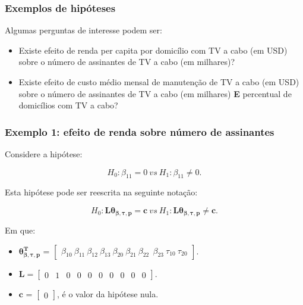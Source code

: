\documentclass[10pt,
  aspectratio=169,
  serif,
  mathserif,
  professionalfont,
  compress,
  handout,
  ]{beamer}\usepackage[]{graphicx}\usepackage[]{color}
\begin{document}

\begin{frame}

\frametitle{Exemplos de hipóteses}

Algumas perguntas de interesse podem ser:

\begin{itemize}
  
  \itemsep 2ex
  
  \item Existe efeito de renda per capita por domicílio com TV a cabo (em USD) sobre o número de assinantes de TV a cabo (em milhares)?
    
  \item Existe efeito de custo médio mensal de manutenção de TV a cabo (em USD) sobre o número de assinantes de TV a cabo (em milhares) \textbf{E} percentual de domicílios com TV a cabo?
  
\end{itemize}

\end{frame}


\begin{frame}

\frametitle{Exemplo 1: efeito de renda sobre número de assinantes}

Considere a hipótese:

$$H_0: \beta_{11} = 0 \ vs \ H_1: \beta_{11} \neq 0.$$

Esta hipótese pode ser reescrita na seguinte notação:

$$H_0: \boldsymbol{L}\boldsymbol{\theta_{\beta,\tau,p}} = \boldsymbol{c} \ vs \ H_1: \boldsymbol{L}\boldsymbol{\theta_{\beta,\tau,p}} \neq \boldsymbol{c}.$$ 

Em que:

\begin{itemize}
  
  \item $\boldsymbol{\theta_{\beta,\tau,p}^T}$ = $\begin{bmatrix} \beta_{10} \  \beta_{11} \ \beta_{12} \ \beta_{13} \ \beta_{20} \ \beta_{21} \ \beta_{22} \ \ \beta_{23} \ \tau_{10} \ \tau_{20} \end{bmatrix}$.

\item $\boldsymbol{L} = \begin{bmatrix} 0 & 1 & 0 & 0 & 0 & 0 & 0 & 0 & 0 & 0  \end{bmatrix}.$
 
\item $\boldsymbol{c}$ = $\begin{bmatrix} 0 \end{bmatrix}$, é o valor da hipótese nula. 

\end{itemize}

\end{frame}
\end{document}
